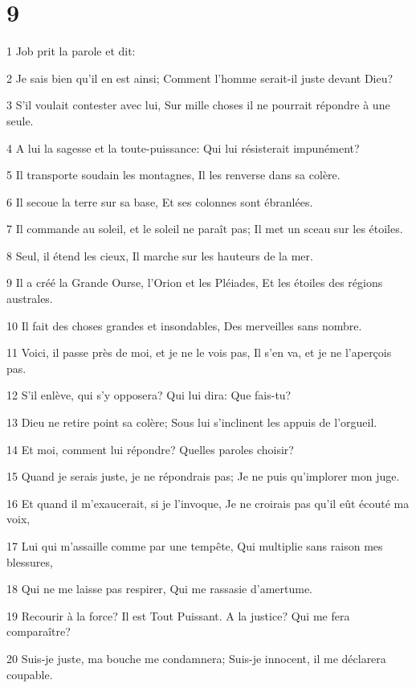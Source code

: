 \chapter{9}

\par 1 Job prit la parole et dit:
\par 2 Je sais bien qu'il en est ainsi; Comment l'homme serait-il juste devant Dieu?
\par 3 S'il voulait contester avec lui, Sur mille choses il ne pourrait répondre à une seule.
\par 4 A lui la sagesse et la toute-puissance: Qui lui résisterait impunément?
\par 5 Il transporte soudain les montagnes, Il les renverse dans sa colère.
\par 6 Il secoue la terre sur sa base, Et ses colonnes sont ébranlées.
\par 7 Il commande au soleil, et le soleil ne paraît pas; Il met un sceau sur les étoiles.
\par 8 Seul, il étend les cieux, Il marche sur les hauteurs de la mer.
\par 9 Il a créé la Grande Ourse, l'Orion et les Pléiades, Et les étoiles des régions australes.
\par 10 Il fait des choses grandes et insondables, Des merveilles sans nombre.
\par 11 Voici, il passe près de moi, et je ne le vois pas, Il s'en va, et je ne l'aperçois pas.
\par 12 S'il enlève, qui s'y opposera? Qui lui dira: Que fais-tu?
\par 13 Dieu ne retire point sa colère; Sous lui s'inclinent les appuis de l'orgueil.
\par 14 Et moi, comment lui répondre? Quelles paroles choisir?
\par 15 Quand je serais juste, je ne répondrais pas; Je ne puis qu'implorer mon juge.
\par 16 Et quand il m'exaucerait, si je l'invoque, Je ne croirais pas qu'il eût écouté ma voix,
\par 17 Lui qui m'assaille comme par une tempête, Qui multiplie sans raison mes blessures,
\par 18 Qui ne me laisse pas respirer, Qui me rassasie d'amertume.
\par 19 Recourir à la force? Il est Tout Puissant. A la justice? Qui me fera comparaître?
\par 20 Suis-je juste, ma bouche me condamnera; Suis-je innocent, il me déclarera coupable.
